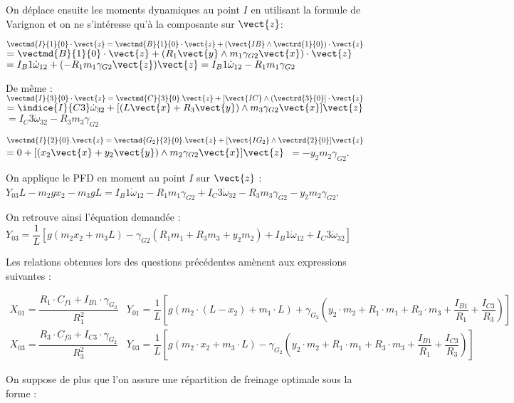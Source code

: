 \begin{corrige}
On déplace ensuite les moments dynamiques au point $I$ en utilisant la formule de Varignon et on ne s’intéresse qu’à la composante sur $\vect{z}$:

$\vectmd{I}{1}{0} \cdot \vect{z}  
= \vectmd{B}{1}{0} \cdot \vect{z} +\left(\vect{IB} \wedge \vectrd{1}{0} \right)\cdot \vect{z} $
$= \vectmd{B}{1}{0} \cdot \vect{z} +\left(R_1 \vect{y} \wedge m_1 \gamma_{G2} \vect{x} \right)\cdot \vect{z} $
$=I_B1 \dot{\omega}_{12}+(-R_1 m_1 \gamma_{G2} \vect{z} ) \vect{z}=I_B1 \dot{\omega}_{12}-R_1 m_1 \gamma_{G2}$

De même :
$\vectmd{I}{3}{0}\cdot \vect{z}=\vectmd{C}{3}{0}.\vect{z}+[\vect{IC}\wedge(\vectrd{3}{0}] \cdot \vect{z}$
$=\indice{I}{C3} \dot{\omega}_{32}+[(L\vect{x}+R_3 \vect{y} )\wedge m_3 \gamma_{G2} \vect{x} ]\vect{z}$
$=I_C3 \dot{\omega}_{32}-R_3 m_3 \gamma_{G2}$

$\vectmd{I}{2}{0}.\vect{z}=\vectmd{G_2}{2}{0}.\vect{z}+[\vect{IG_2}\wedge\vectrd{2}{0}] \vect{z}$
$=0+[(x_2 \vect{x}+y_2 \vect{y} )\wedge m_2 \gamma_{G2} \vect{x} ]\vect{z}$
$=-y_2 m_2 \gamma_{G2}$.

On applique le PFD en moment au point $I$ sur $\vect{z}$ :
$Y_{03} L-m_2 gx_2-m_3 gL=I_B1 \dot{\omega}_{12}-R_1 m_1 \gamma_{G2}+I_C3 \dot{\omega}_{32}-R_3 m_3 \gamma_{G2}-y_2 m_2 \gamma_{G2}$.

On retrouve ainsi l’équation demandée :
$Y_{03}=\dfrac{1}{L} [g (m_2 x_2+m_3 L)-\gamma_{G2} (R_1 m_1+R_3 m_3+y_2 m_2 )+I_B1 \dot{\omega}_{12}+I_C3 \dot{\omega}_{32}]$

\end{corrige}
\else
\fi

\ifprof
\else
Les relations obtenues lors des questions précédentes amènent aux expressions suivantes :

$
\begin{array}{ll}
X_{01}=\dfrac{R_{1} \cdot C_{f 1}+I_{B 1} \cdot \gamma_{G_{2}}}{R_{1}^{2}} & Y_{01}=\dfrac{1}{L}\left[g\left(m_{2} \cdot\left(L-x_{2}\right)+m_{1} \cdot L\right)+\gamma_{G_{2}}\left(y_{2} \cdot m_{2}+R_{1} \cdot m_{1}+R_{3} \cdot m_{3}+\dfrac{I_{B 1}}{R_{1}}+\dfrac{I_{C 3}}{R_{3}}\right)\right] \\
X_{03}=\dfrac{R_{3} \cdot C_{f 3}+I_{C 3} \cdot \gamma_{G_{2}}}{R_{3}^{2}} & Y_{03}=\dfrac{1}{L}\left[g\left(m_{2} \cdot x_{2}+m_{3} \cdot L\right)-\gamma_{G_{2}}\left(y_{2} \cdot m_{2}+R_{1} \cdot m_{1}+R_{3} \cdot m_{3}+\dfrac{I_{B 1}}{R_{1}}+\dfrac{I_{C 3}}{R_{3}}\right)\right]
\end{array}
$

On suppose de plus que l'on assure une répartition de freinage optimale sous la forme :

